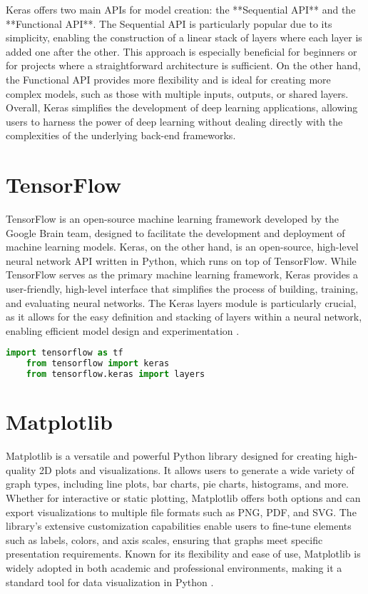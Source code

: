 Keras offers two main APIs for model creation: the **Sequential API** and the **Functional API**. The Sequential API is particularly popular due to its simplicity, enabling the construction of a linear stack of layers where each layer is added one after the other. This approach is especially beneficial for beginners or for projects where a straightforward architecture is sufficient. On the other hand, the Functional API provides more flexibility and is ideal for creating more complex models, such as those with multiple inputs, outputs, or shared layers. Overall, Keras simplifies the development of deep learning applications, allowing users to harness the power of deep learning without dealing directly with the complexities of the underlying back-end frameworks.

\section{TensorFlow}

TensorFlow is an open-source machine learning framework developed by the Google Brain team, designed to facilitate the development and deployment of machine learning models. Keras, on the other hand, is an open-source, high-level neural network API written in Python, which runs on top of TensorFlow. While TensorFlow serves as the primary machine learning framework, Keras provides a user-friendly, high-level interface that simplifies the process of building, training, and evaluating neural networks. The Keras layers module is particularly crucial, as it allows for the easy definition and stacking of layers within a neural network, enabling efficient model design and experimentation \cite{TensorFlow:2023}.

\begin{lstlisting}[language=Python, caption={Importing TensorFlow and Keras modules}, label={code:import-tensorflow}, style=pythonstyle]
	import tensorflow as tf
	from tensorflow import keras
	from tensorflow.keras import layers
\end{lstlisting}

\section{Matplotlib}

Matplotlib is a versatile and powerful Python library designed for creating high-quality 2D plots and visualizations. It allows users to generate a wide variety of graph types, including line plots, bar charts, pie charts, histograms, and more. Whether for interactive or static plotting, Matplotlib offers both options and can export visualizations to multiple file formats such as PNG, PDF, and SVG. The library's extensive customization capabilities enable users to fine-tune elements such as labels, colors, and axis scales, ensuring that graphs meet specific presentation requirements. Known for its flexibility and ease of use, Matplotlib is widely adopted in both academic and professional environments, making it a standard tool for data visualization in Python \cite{Hunter:2007}.

